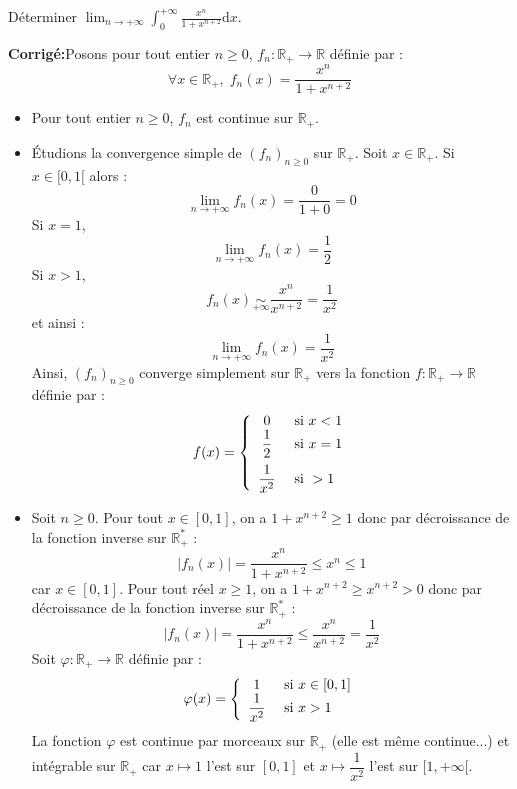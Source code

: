 \documentclass[a4paper,twoside,french,10pt]{VcCours}
\newcommand{\dx}{\text{d}x}
\newcommand{\corr}{\textbf{Corrigé:}}
\begin{document}
\begin{Exercice}{} Déterminer $\lim_{n \rightarrow + \infty}\int_{0}^{ + \infty} \frac{x^{n}}{1 + x^{n + 2}} \dx$.
\end{Exercice}

\corr Posons pour tout entier $n \geq 0$, $f_n : \mathbb{R}_+ \rightarrow \mathbb{R}$ définie par :
$$ \forall x \in \mathbb{R}_+, \; f_n(x) = \frac{x^{n}}{1 + x^{n + 2}}$$
\begin{itemize}
\item Pour tout entier $n \geq 0$, $f_n$ est continue sur $\mathbb{R}_+$.
\item Étudions la convergence simple de $(f_n)_{n \geq 0}$ sur $\mathbb{R}_+$. Soit $x \in \mathbb{R}_+$. Si $x \in [0,1[$ alors :
$$ \lim_{n \rightarrow + \infty} f_n(x)= \dfrac{0}{1+0} = 0$$
Si $x=1$,
$$ \lim_{n \rightarrow + \infty} f_n(x)= \dfrac{1}{2}$$
Si $x>1$,
$$ f_n(x) \underset{+ \infty}{\sim} \dfrac{x^n}{x^{n+2}} = \dfrac{1}{x^2}$$
et ainsi :
$$ \lim_{n \rightarrow + \infty} f_n(x) = \dfrac{1}{x^2}$$
Ainsi, $(f_n)_{n \geq 0}$ converge simplement sur $\mathbb{R}_+$ vers la fonction $f : \mathbb{R}_+ \rightarrow \mathbb{R}$ définie par :
$$ f(x) = \left\lbrace \begin{array}{cl}
0 & \hbox{ si } x<1 \\
\dfrac{1}{2} & \hbox{ si } x=1 \\[0.3cm]
\dfrac{1}{x^2} & \hbox{ si } >1  
\end{array}\right.$$
\item Soit $n \geq 0$. Pour tout $x \in [0,1]$, on a $1+x^{n+2}\geq 1$ donc par décroissance de la fonction inverse sur $\mathbb{R}_+^*$ :
$$ \left\vert f_n(x) \right\vert = \dfrac{x^n}{1+x^{n+2}} \leq  x^n \leq 1$$
car $x \in [0,1]$. Pour tout réel $x\geq 1$, on a $1+x^{n+2}\geq x^{n+2}>0$ donc par décroissance de la fonction inverse sur $\mathbb{R}_+^*$ :
$$ \left\vert f_n(x) \right\vert = \dfrac{x^n}{1+x^{n+2}} \leq \dfrac{x^n}{x^{n+2}}= \dfrac{1}{x^2}$$
Soit $\varphi : \mathbb{R}_+ \rightarrow \mathbb{R}$ définie par :
$$ \varphi(x) = \left\lbrace \begin{array}{cl}
1 & \hbox{ si } x \in [0,1] \\
\dfrac{1}{x^2} & \hbox{ si } x>1 \\
\end{array}\right.$$
La fonction $\varphi$ est continue par morceaux sur $\mathbb{R}_+$ (elle est même continue...) et intégrable sur $\mathbb{R}_+$ car $x \mapsto 1$ l'est sur $[0,1]$ et $x \mapsto \dfrac{1}{x^2}$ l'est sur $[1, + \infty[$. 
\end{itemize}
\end{document}
